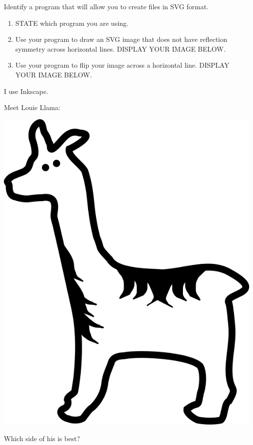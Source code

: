 \documentclass[noauthor,nooutcomes,12pt,hints,handout]{ximera}
\begin{document}
\begin{question}
  Identify a program that will allow you to create files in SVG
  format.
  \begin{enumerate}
  \item STATE which program you are using.
  \item Use your program to draw an SVG image that does not have
    reflection symmetry across horizontal lines. DISPLAY YOUR IMAGE
    BELOW.
  \item Use your program to flip your image across a horizontal
    line. DISPLAY YOUR IMAGE BELOW.
  \end{enumerate}
  \begin{freeResponse}
  \item I use Inkscape.
  \item Meet Louie Llama:
    \begin{center}
      \includegraphics{llama.png}
    \end{center}
  \item Which side of his is best?
    \begin{center}

\end{center}
\end{freeResponse}
\end{question}
\end{document}
